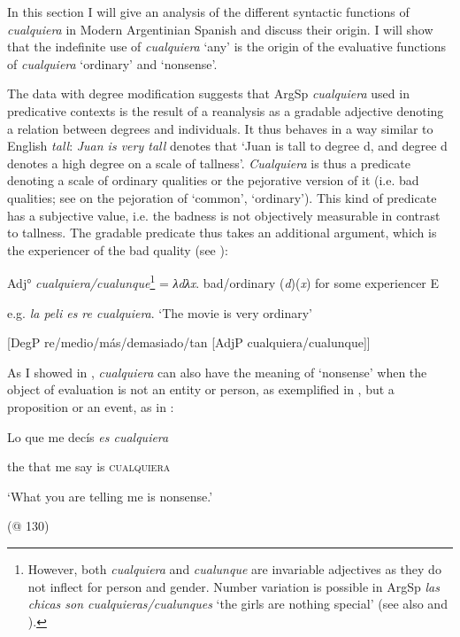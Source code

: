 In this section I will give an analysis of the different syntactic functions of \textit{cualquiera} in Modern Argentinian Spanish and discuss their origin. I will show that the indefinite use of \textit{cualquiera} ‘any’ is the origin of the evaluative functions of \textit{cualquiera} ‘ordinary’ and ‘nonsense’.

  The data with degree modification suggests that ArgSp \textit{cualquiera} used in predicative contexts is the result of a reanalysis as a gradable adjective denoting a relation between degrees and individuals. It thus behaves in a way similar to English \textit{tall}: \textit{Juan is very tall} denotes that ‘Juan is tall to degree d, and degree d denotes a high degree on a scale of tallness’. \textit{Cualquiera} is thus a predicate denoting a scale of ordinary qualities or the pejorative version of it (i.e. bad qualities; see  on the pejoration of ‘common’, ‘ordinary’). This kind of predicate has a subjective value, i.e. the badness is not objectively measurable in contrast to tallness. The gradable predicate thus takes an additional argument, which is the experiencer of the bad quality (see ):

    Adj° \textit{cualquiera/cualunque}\footnote{{However, both} {\textit{cualquiera}} {and} {\textit{cualunque}} {are invariable adjectives as they do not inflect for person and gender. Number variation is possible in ArgSp} {\textit{las chicas son cualquieras/cualunques}} {‘the girls are nothing special’ (see also \citealt{Rainer1993} and ).}} = \textit{λdλx}. bad/ordinary (\textit{d})(\textit{x}) for some experiencer E

e.g. \textit{la peli es re cualquiera}. ‘The movie is very ordinary’

    [DegP re/medio/más/demasiado/tan [AdjP cualquiera/cualunque]]

As I showed in , \textit{cualquiera} can also have the meaning of ‘nonsense’ when the object of evaluation is not an entity or person, as exemplified in , but a proposition or an event, as in :

    Lo  que  me  decís  \textit{es  cualquiera}

    the  that  me  say  is  \textsc{cualquiera}

    ‘What you are telling me is nonsense.’

    (@ 130)

